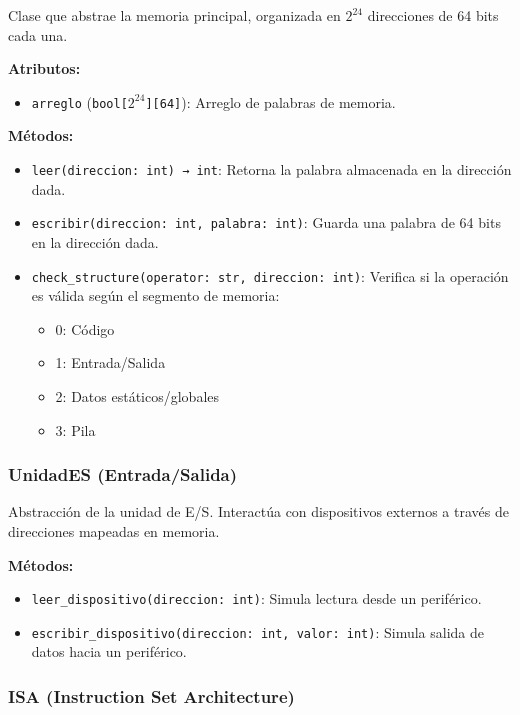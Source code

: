 \documentclass{article}
\begin{document}
Clase que abstrae la memoria principal, organizada en $2^{24}$ direcciones de 64 bits cada una.

\textbf{Atributos:}
\begin{itemize}
  \item \texttt{arreglo} (\texttt{bool[$2^{24}$][64]}): Arreglo de palabras de memoria.
\end{itemize}

\textbf{Métodos:}
\begin{itemize}
  \item \texttt{leer(direccion: int) → int}: Retorna la palabra almacenada en la dirección dada.
  \item \texttt{escribir(direccion: int, palabra: int)}: Guarda una palabra de 64 bits en
        la dirección dada.
  \item \texttt{check\_structure(operator: str, direccion: int)}: Verifica si la operación es válida
        según el segmento de memoria:
        \begin{itemize}
          \item 0: Código
          \item 1: Entrada/Salida
          \item 2: Datos estáticos/globales
          \item 3: Pila
        \end{itemize}
\end{itemize}

\subsubsection*{UnidadES (Entrada/Salida)}

Abstracción de la unidad de E/S. Interactúa con dispositivos externos a través de direcciones
mapeadas en memoria.

\textbf{Métodos:}
\begin{itemize}
  \item \texttt{leer\_dispositivo(direccion: int)}: Simula lectura desde un periférico.
  \item \texttt{escribir\_dispositivo(direccion: int, valor: int)}: Simula salida de datos hacia
        un periférico.
\end{itemize}

\subsubsection*{ISA (Instruction Set Architecture)}
\end{document}
